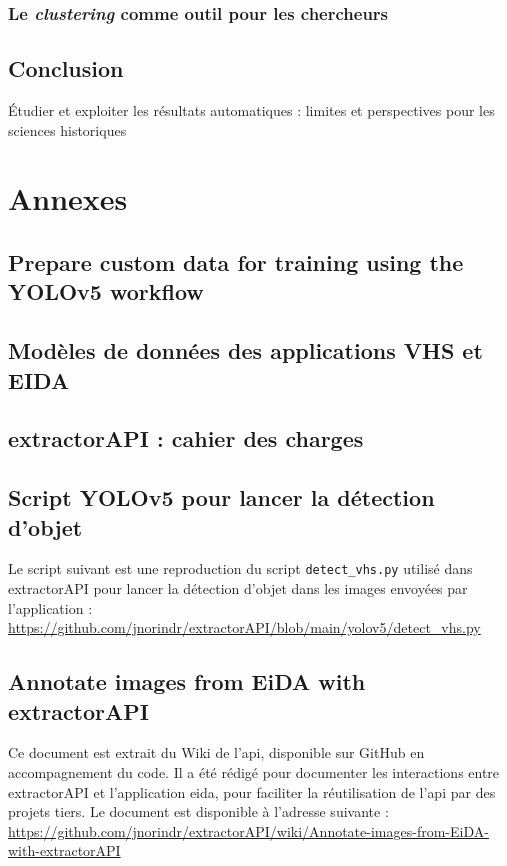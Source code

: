 \documentclass[a4paper,12pt,twoside]{book}
\newcommand{\exapi}{extractorAPI\xspace}
\newcommand{\api}{\gls{api}\xspace}
\newcommand{\eida}{\gls{eida}\xspace}
\newcommand{\clearemptydoublepage}{\newpage{\pagestyle{empty}\cleardoublepage}}
\newcommand\chapterNo[1]{
  \chapter*{#1}
  \markright{\MakeUppercase{#1}}
}
\begin{document}
                \section{Le \textit{clustering} comme outil pour les chercheurs}
                    
            
        \clearemptydoublepage
    
    \chapterNo{Conclusion}
    Étudier et exploiter les résultats automatiques : limites et perspectives pour les sciences historiques

\appendix
    \part*{Annexes}	
    
    \chapter[Prepare custom data for training]{\label{YOLOv5Training}Prepare custom data for training using the YOLOv5 workflow}
	    
    \chapter[Modèles de données EIDA/VHS]{\label{eidaDataModels}Modèles de données des applications VHS et EIDA}
	    
    \chapter{\label{exapiCahier}extractorAPI : cahier des charges}
	    
	\chapter{\label{yoloScript}Script YOLOv5 pour lancer la détection d'objet}
		Le script suivant est une reproduction du script \texttt{detect\_vhs.py} utilisé dans \exapi pour lancer la détection d'objet dans les images envoyées par l'application : \url{https://github.com/jnorindr/extractorAPI/blob/main/yolov5/detect_vhs.py}
		
	\chapter[Annotate images with extractorAPI]{\label{exapiAnno}Annotate images from EiDA with extractorAPI}
		Ce document est extrait du Wiki de l'\api, disponible sur GitHub en accompagnement du code. Il a été rédigé pour documenter les interactions entre \exapi et l'application \eida, pour faciliter la réutilisation de l'\api par des projets tiers. Le document est disponible à l'adresse suivante : \url{https://github.com/jnorindr/extractorAPI/wiki/Annotate-images-from-EiDA-with-extractorAPI}
		

\clearemptydoublepage

\backmatter
    \printacronyms[title=Liste des acronymes,toctitle=Acronymes]
    \printglossary 
    \listoffigures
    \tableofcontents

	
\end{document}
